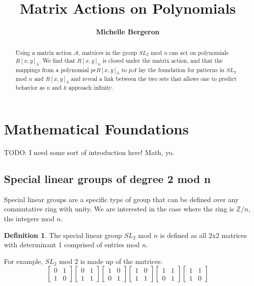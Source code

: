 \documentclass[a4paper,draft]{amsproc}
\title[Matrix Actions]{Matrix Actions on Polynomials}
\author[Bergeron]{\bfseries Michelle Bergeron}
\theoremstyle{plain}
\theoremstyle{definition}
\newtheorem{dfn}{Definition}[section]
\theoremstyle{remark}
\numberwithin{equation}{section}
\begin{document}
\vspace{18mm} \setcounter{page}{1} \thispagestyle{empty}


\begin{abstract}
Using a matrix action $\mathcal{A}$, matrices in the group $SL_{2}$ mod $n$ can act on polynomials $R[x,y]_{k}$. We find that $R[x,y]_{k}$ is closed under the matrix action, and that the mappings from a polynomial $p \epsilon R[x,y]_{k}$ to  $p\mathcal{A}$ lay the foundation for patterns in $SL_{2}$ mod $n$ and $R[x,y]_{k}$ and reveal a link between the two sets that allows one to predict behavior as $n$ and $k$ approach infinity.
\end{abstract}

\maketitle

\section{Mathematical Foundations} 

TODO: I need some sort of introduction here! Math, yo. 

\subsection{Special linear groups of degree 2 mod n}
Special linear groups are a specific type of group that can be defined over any commutative ring with unity. We are interested in the case where the ring is $\mathbb{Z}/n$, the integers mod $n$. 
\begin{dfn}
The special linear group $SL_{2}$ mod $n$ is defined as all 2x2 matrices with determinant 1 comprised of entries mod $n$.
\end{dfn}

For example, $SL_{2}$ mod 2 is made up of the matrices:
$$
\begin{bmatrix}
 0&1 \\ 
 1&0 
\end{bmatrix}
\begin{bmatrix}
 0&1 \\ 
 1&1 
\end{bmatrix}
\begin{bmatrix}
 1&0 \\ 
 0&1 
\end{bmatrix}
\begin{bmatrix}
 1&0 \\ 
 1&1 
\end{bmatrix}
\begin{bmatrix}
 1&1 \\ 
 0&1 
\end{bmatrix}
\begin{bmatrix}
 1&1 \\ 
 1&0 
\end{bmatrix}
$$
\end{document}
